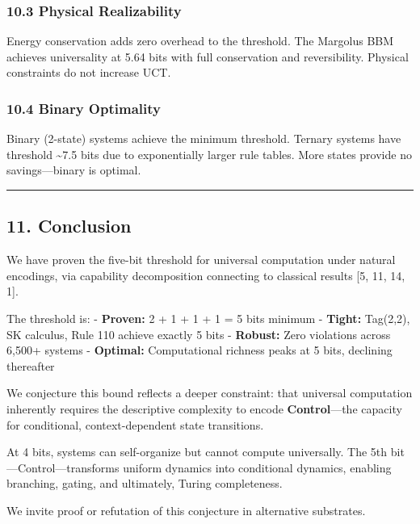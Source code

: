 \documentclass[
  11pt,
]{article}
\begin{document}
\hypertarget{physical-realizability}{%
\subsubsection{10.3 Physical
Realizability}\label{physical-realizability}}

Energy conservation adds zero overhead to the threshold. The Margolus
BBM achieves universality at 5.64 bits with full conservation and
reversibility. Physical constraints do not increase UCT.

\hypertarget{binary-optimality}{%
\subsubsection{10.4 Binary Optimality}\label{binary-optimality}}

Binary (2-state) systems achieve the minimum threshold. Ternary systems
have threshold \textasciitilde7.5 bits due to exponentially larger rule
tables. More states provide no savings---binary is optimal.

\begin{center}\rule{0.5\linewidth}{0.5pt}\end{center}

\hypertarget{conclusion}{%
\subsection{11. Conclusion}\label{conclusion}}

We have proven the five-bit threshold for universal computation under
natural encodings, via capability decomposition connecting to classical
results {[}5, 11, 14, 1{]}.

The threshold is: - \textbf{Proven:} 2 + 1 + 1 + 1 = 5 bits minimum -
\textbf{Tight:} Tag(2,2), SK calculus, Rule 110 achieve exactly 5 bits -
\textbf{Robust:} Zero violations across 6,500+ systems -
\textbf{Optimal:} Computational richness peaks at 5 bits, declining
thereafter

We conjecture this bound reflects a deeper constraint: that universal
computation inherently requires the descriptive complexity to encode
\textbf{Control}---the capacity for conditional, context-dependent state
transitions.

At 4 bits, systems can self-organize but cannot compute universally. The
5th bit---Control---transforms uniform dynamics into conditional
dynamics, enabling branching, gating, and ultimately, Turing
completeness.

We invite proof or refutation of this conjecture in alternative
substrates.
\end{document}
